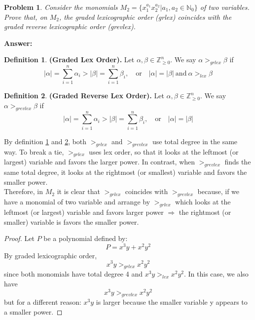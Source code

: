 \documentclass[a4paper,12pt]{article}
\newtheorem{prob}{Problem}[]
\theoremstyle{definition}
\newtheorem{definition}{Definition}[]
\newcommand{\N}{\mathbb{N}}
\newcommand{\Z}{\mathbb{Z}}
\begin{document}
\begin{prob}
	Consider the monomials $M_2 = \{ x_1^{a_1} x_2^{a_2} | a_1,a_2 \in \N_0 \}$ of two variables. Prove that, on $M_2$, the graded lexicographic order (grlex) coincides with the graded reverse lexicographic order (grevlex).
\end{prob}
\textbf{Answer:}
\begin{definition}\label{def:grlex}
	\textbf{(Graded Lex Order).} Let $\alpha,\beta \in \Z^n_{\geq 0}$. We say $\alpha >_{grlex} \beta$ if
	\begin{equation*}
	\left|\alpha\right| = \sum_{i=1}^{n} \alpha_i > \left|\beta\right| = \sum_{i=1}^{n} \beta_i, \quad \text{or} \quad \left|\alpha\right| = \left|\beta\right|\ \text{and}\ \alpha >_{lex} \beta
	\end{equation*}
\end{definition}
\begin{definition}\label{def:grevlex}
	\textbf{(Graded Reverse Lex Order).} Let $\alpha,\beta \in \Z^n_{\geq 0}$. We say $\alpha >_{grevlex} \beta$ if
	\begin{equation*}
	\left|\alpha\right| = \sum_{i=1}^{n} \alpha_i > \left|\beta\right| = \sum_{i=1}^{n} \beta_i, \quad \text{or} \quad \left|\alpha\right| = \left|\beta\right|
	\end{equation*}
\end{definition}
By definition \ref{def:grlex} and \ref{def:grevlex}, both $>_{grlex}$ and $>_{grevlex}$ use total degree in the same way. To break a tie, $>_{grlex}$ uses lex order, so that it looks at the leftmost (or largest) variable and favors the larger power. In contrast, when $>_{grevlex}$ finds the same total degree, it looks at the rightmost (or smallest) variable and favors the smaller power.\\
Therefore, in $M_2$ it is clear that $>_{grlex}$ coincides with $>_{grevlex}$ because, if we have a monomial of two variable and arrange by $>_{grlex}$ which looks at the leftmost (or largest) variable and favors larger power $\Rightarrow$ the rightmost (or smaller) variable is favors the smaller power.
\begin{proof}
	Let $P$ be a polynomial defined by:
	\begin{equation*}
	P = x^3y + x^2y^2
	\end{equation*}
	By graded lexicographic order,
	\begin{equation*}
	x^3y >_{grlex} x^2y^2
	\end{equation*}
	since both monomials have total degree 4 and $x^3y >_{lex} x^2y^2$. In this case, we also have
	\begin{equation*}
	x^3y >_{grevlex} x^2y^2
	\end{equation*}
	but for a different reason: $x^3y$ is larger because the smaller variable y appears to a smaller power.
\end{proof}
\end{document}
